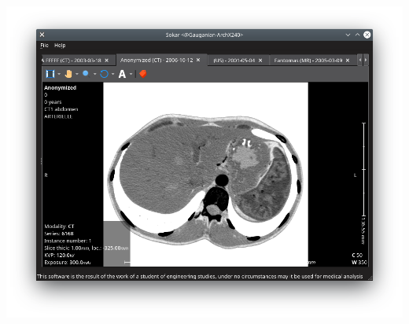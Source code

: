 \documentclass[aspectratio=169]{beamer}
\begin{document}
\begin{frame}
\begin{columns}
        \includegraphics[width=\textwidth]{img/end3.png}
    \end{columns}

\end{frame}
\end{document}
